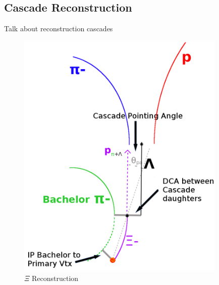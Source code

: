 \subsection{Cascade Reconstruction}
\label{CascadeReconstruction}

Talk about reconstruction cascades

\begin{figure}[h]
  \centering
  \includegraphics[width=100mm]{3_DataSelection/Figures/XiCuts.png}
  \caption[$\Xi$ Reconstruction]{$\Xi$ Reconstruction}
  \label{fig:XiReconstruction}
\end{figure}